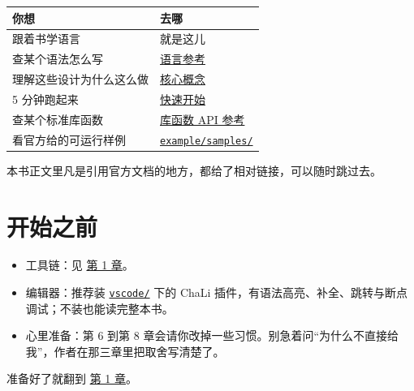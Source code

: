 \begin{center}
\begin{tabular}{ll}
\toprule
你想 & 去哪 \\
\midrule
跟着书学语言 & 就是这儿 \\
查某个语法怎么写 & \href{https://gitee.com/rabbitc999/chali/blob/master/doc/04-language-reference.md}{语言参考} \\
理解这些设计为什么这么做 & \href{https://gitee.com/rabbitc999/chali/blob/master/doc/03-core-concepts.md}{核心概念} \\
5 分钟跑起来 & \href{https://gitee.com/rabbitc999/chali/blob/master/doc/01-quickstart.md}{快速开始} \\
查某个标准库函数 & \href{https://gitee.com/rabbitc999/chali/blob/master/doc/library/README.md}{库函数 API 参考} \\
看官方给的可运行样例 & \href{https://gitee.com/rabbitc999/chali/tree/master/example/samples}{\texttt{example/\allowbreak{}samples/\allowbreak{}}} \\
\bottomrule
\end{tabular}
\end{center}

本书正文里凡是引用官方文档的地方，都给了相对链接，可以随时跳过去。

\section*{开始之前}

\begin{itemize}

\item 工具链：见 \hyperref[ch:01]{第 1 章}。

\item 编辑器：推荐装 \href{https://gitee.com/rabbitc999/chali/tree/master/vscode}{\texttt{vscode/\allowbreak{}}} 下的 ChaLi 插件，有语法高亮、补全、跳转与断点调试；不装也能读完整本书。

\item 心里准备：第 6 到第 8 章会请你改掉一些习惯。别急着问“为什么不直接给我”，作者在那三章里把取舍写清楚了。

\end{itemize}

准备好了就翻到 \hyperref[ch:01]{第 1 章}。
